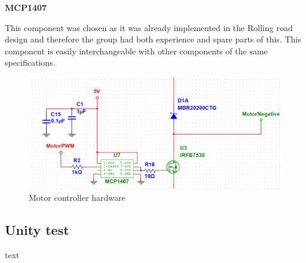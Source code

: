 \textbf{MCP1407}

This component was chosen as it was already implemented in the Rolling road design and therefore the group had both experience and spare parts of this. This component is easily interchangeable with other components of the same specifications. 

\begin{figure}[H]
	\centering
	\includegraphics[width=0.85\linewidth]{Hardware/Pictures/Motorstyring}
	\caption{Motor controller hardware}
	\label{fig:Motorcontroller}
\end{figure}


\subsection{Unity test}
text
